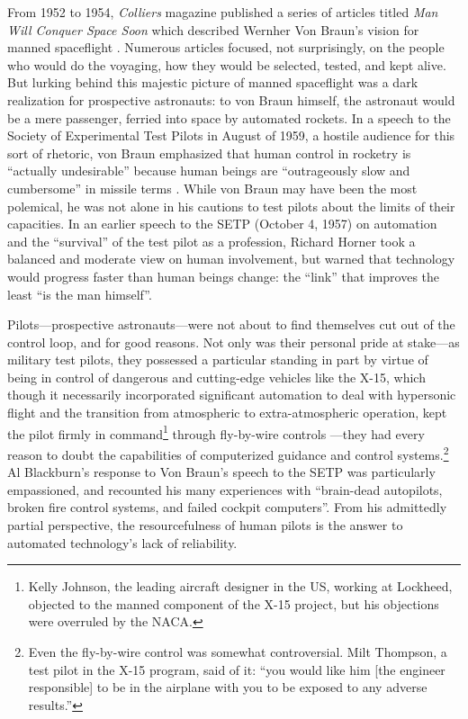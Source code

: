 From 1952 to 1954, \emph{Colliers} magazine published a series of articles
titled \emph{Man Will Conquer Space Soon} which described Wernher Von
Braun's vision for manned spaceflight \cite{scribdCollier} \cite{dreamsofspace}. Numerous
articles focused, not surprisingly, on the people who would do the
voyaging, how they would be selected, tested, and kept alive. But
lurking behind this majestic picture of manned spaceflight was a dark
realization for prospective astronauts: to von Braun himself, the
astronaut would be a mere passenger, ferried into space by automated
rockets. In a speech to the Society of Experimental Test Pilots in
August of 1959, a hostile audience for this sort of rhetoric, von
Braun emphasized that human control in rocketry is ``actually
undesirable'' because human beings are ``outrageously slow and
cumbersome'' in missile terms \cite[p. 66-67]{DM}. While von Braun
may have been the most polemical, he was not alone in his cautions to
test pilots about the limits of their capacities.
In an earlier speech to the SETP (October 4, 1957) on automation and
the ``survival'' of the test pilot as a profession, Richard Horner
took a balanced and moderate view on human involvement, but warned
that technology would progress faster than human beings change:
the ``link'' that improves the least ``is the man himself''\cite[p. 19]{DM}.

Pilots---prospective astronauts---were not about to find themselves
cut out of the control loop, and for good reasons. Not only was their
personal pride at stake---as military test pilots, they possessed a
particular standing in part by virtue of being in control of dangerous
and cutting-edge vehicles like the X-15, which though it necessarily
incorporated significant automation to deal with hypersonic flight and
the transition from atmospheric to extra-atmospheric operation, kept
the pilot firmly in command\footnote{Kelly Johnson, the leading aircraft
designer in the US, working at Lockheed, objected to the manned
component of the X-15
project, but his objections were overruled by the NACA.\cite[p.
  46]{DM}} through fly-by-wire controls \cite[p. 55, 61--62, 77]{hypersonics}---they had 
every reason to doubt the capabilities of computerized guidance and
control systems.\footnote{Even the fly-by-wire control was somewhat
  controversial. Milt Thompson, a test pilot in the X-15 program, said
  of it: ``you would like him [the engineer responsible] to be in the
airplane with you to be exposed to any adverse results.''\cite[p.
  55]{DM}} Al Blackburn's response to Von Braun's speech to the
SETP was particularly empassioned, and recounted his many experiences with
``brain-dead autopilots, broken fire control systems, and failed cockpit
computers''\cite[p. 68]{DM}. From
his admittedly partial perspective, the resourcefulness of human
pilots is the answer to automated technology's lack of reliability.

